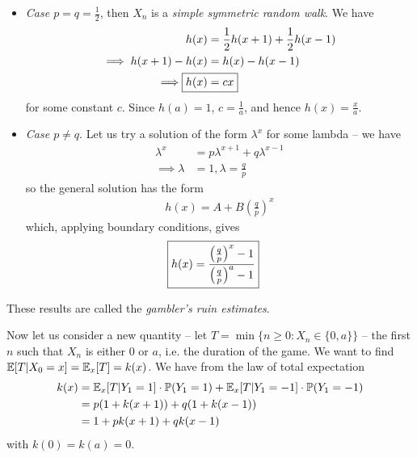 \documentclass{../../template/note}
\begin{document}
    \begin{itemize}
        \item \emph{Case \(p=q=\frac 1 2\)}, then \(X_n\) is a \emph{simple symmetric random walk}. We have
        \begin{align*}
            h(x) &= \frac 1 2 h(x+1) + \frac 1 2 h(x-1) \\
            \implies h(x+1) - h(x) &= h(x) - h(x-1) \\
            \implies \Aboxed{h(x) &= cx}
        \end{align*}
        for some constant \(c\). Since \(h(a) = 1\), \(c = \frac 1 a\), and hence \(h(x) = \frac x a\).
        \item \emph{Case \(p\neq q\)}. Let us try a solution of the form \(\lambda^x\) for some lambda -- we have
        \begin{align*}
            \lambda^x &= p\lambda^{x+1} + q\lambda^{x-1} \\
            \implies \lambda &= 1, \lambda = \frac q p
        \end{align*}
        so the general solution has the form
        \begin{align*}
            h(x) = A + B\left(\frac q p\right)^x
        \end{align*}
        which, applying boundary conditions, gives
        \begin{align*}
            \Aboxed{h(x) = \frac{\left(\frac q p\right)^x - 1}{\left(\frac q p\right)^a-1}}
        \end{align*}
    \end{itemize}
    
    These results are called the \emph{gambler's ruin estimates}.

    Now let us consider a new quantity -- let \(T = \min\{n \geq 0: X_n \in \{0, a\}\}\) -- the first \(n\) such that \(X_n\) is either 0 or \(a\), i.e. the duration of the game. We want to find \(\mathbb E[T | X_0 = x] = \mathbb E_x[T] = k(x)\). We have from the law of total expectation
    \begin{align*}
        k(x) &= \mathbb E_x[T | Y_1 = 1]\cdot\mathbb P(Y_1 = 1) + \mathbb E_x[T | Y_1 = -1]\cdot\mathbb P(Y_1 = -1) \\
        &= p(1 + k(x+1)) + q(1 + k(x-1)) \\
        &= 1 + pk(x+1) + qk(x-1)
    \end{align*}
    with \(k(0) = k(a) = 0\).
\end{document}
